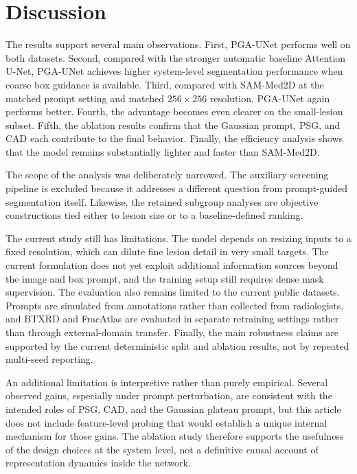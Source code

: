 \documentclass{ieeeaccess}
\begin{document}
\section{Discussion}
The results support several main observations. First, PGA-UNet performs well on both datasets. Second, compared with the stronger automatic baseline Attention U-Net, PGA-UNet achieves higher system-level segmentation performance when coarse box guidance is available. Third, compared with SAM-Med2D at the matched prompt setting and matched $256\times256$ resolution, PGA-UNet again performs better. Fourth, the advantage becomes even clearer on the small-lesion subset. Fifth, the ablation results confirm that the Gaussian prompt, PSG, and CAD each contribute to the final behavior. Finally, the efficiency analysis shows that the model remains substantially lighter and faster than SAM-Med2D.

The scope of the analysis was deliberately narrowed. The auxiliary screening pipeline is excluded because it addresses a different question from prompt-guided segmentation itself. Likewise, the retained subgroup analyses are objective constructions tied either to lesion size or to a baseline-defined ranking.

The current study still has limitations. The model depends on resizing inputs to a fixed resolution, which can dilute fine lesion detail in very small targets. The current formulation does not yet exploit additional information sources beyond the image and box prompt, and the training setup still requires dense mask supervision. The evaluation also remains limited to the current public datasets. Prompts are simulated from annotations rather than collected from radiologists, and BTXRD and FracAtlas are evaluated in separate retraining settings rather than through external-domain transfer. Finally, the main robustness claims are supported by the current deterministic split and ablation results, not by repeated multi-seed reporting.

An additional limitation is interpretive rather than purely empirical. Several observed gains, especially under prompt perturbation, are consistent with the intended roles of PSG, CAD, and the Gaussian plateau prompt, but this article does not include feature-level probing that would establish a unique internal mechanism for those gains. The ablation study therefore supports the usefulness of the design choices at the system level, not a definitive causal account of representation dynamics inside the network.
\end{document}
